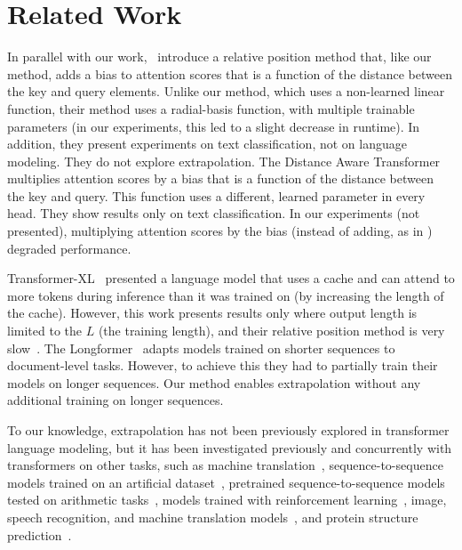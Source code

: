 
\section{Related Work}
In parallel with our work,~\citet{wennberg2021case} introduce a relative position method that, like our method, adds a bias to attention scores that is a function of the distance between the key and query elements. 
Unlike our \al method, which uses a  non-learned linear function, their method uses a radial-basis function, with multiple trainable parameters (in our experiments, this led to a slight decrease in runtime). 
In addition, they present experiments on text classification, not on language modeling.  They do not explore extrapolation.
The Distance Aware Transformer~\citep{da-transformer} multiplies attention scores by a bias that is a function of the distance between the key and query. This function uses a different, learned parameter in every head. They show results only on text classification. In our experiments (not presented), multiplying attention scores by the bias (instead of adding, as in \al) degraded performance. 

Transformer-XL~\citep{transformer-xl}  presented a language model that uses a cache and can attend to more tokens during inference than it was trained on (by increasing the length of the cache). However, this work presents results only where output length is limited to the $L$ (the training length), and their relative position method is very slow~\citep{shortformer}. 
The Longformer~\citep{longformer} adapts models trained on shorter sequences to document-level tasks. However, to achieve this they had to partially train their models on longer sequences. Our \al method enables extrapolation without any additional training on longer sequences. 

To our knowledge, extrapolation has not been previously explored in transformer language modeling, but it has been investigated previously and concurrently with transformers on other tasks, such as %
machine translation~\citep{rosendahl2019:pos_enc, neishi-yoshinaga-2019-relation, newman2020extrapolation, Kiyono2021SHAPESA}, sequence-to-sequence models trained on an artificial dataset~\citep{Hupkes2020}, pretrained sequence-to-sequence models tested on arithmetic tasks~\citep[Appendix C]{Nogueira2021InvestigatingTL}, models trained with reinforcement learning~\citep{lampinen2021towards}, image, speech recognition, and machine translation models~\citep{likhomanenko2021cape}, and protein structure prediction~\citep[Appendix 1.5]{Jumper2021HighlyAP}. 






